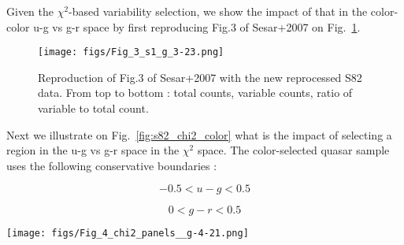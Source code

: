 \documentclass[fleqn,usenatbib]{mnras}  %
\begin{document}
Given  the $\chi^{2}$-based variability selection, we show the impact of that in the color-color  u-g vs g-r space by first reproducing Fig.3 of Sesar+2007 on Fig.~\ref{fig:s82_color}.


\begin{figure}
 \texttt{[image: figs/Fig\_3\_s1\_g\_3-23.png]}
 \caption{Reproduction of Fig.3 of Sesar+2007 with the new reprocessed S82 data. From top to bottom : total counts, variable counts, ratio of variable to total count. }
 \label{fig:s82_color}
\end{figure}

Next we illustrate on Fig.~\ref{fig:s82_chi2_color} what is the impact of  selecting a region in the u-g vs g-r space in the $\chi^{2}$ space. The color-selected quasar sample uses the following conservative boundaries : 

\begin{equation}
-0.5 <u-g < 0.5
\end{equation}


\begin{equation}
0 < g-r< 0.5
\end{equation}


\begin{figure*}
 \texttt{[image: figs/Fig\_4\_chi2\_panels\_\_g-4-21.png]}
 \caption{An impact of color selection in variability space. Left panel contains all objects with 4<g<21, and extendedness=0 . The middle panel depicts the count of those objects that fulfill color criteria  $-0.5 <u-g < 0.5$ and $0 < g-r< 0.5$ . The right panel shows counts of  the ratio of number of color-selected objects to total number, i.e. ratio of middle to left panels. }
 \label{fig:s82_chi2_color}
\end{figure*}








%

\end{document}
